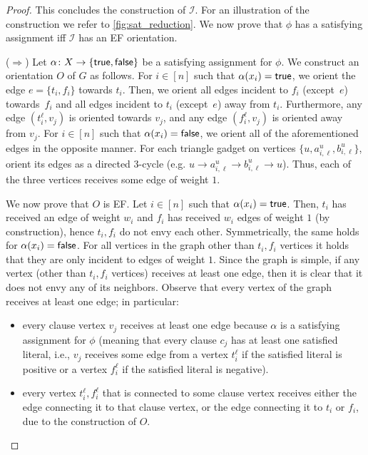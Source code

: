 \begin{proof}
    This concludes the construction of $\mathcal{I}$.
    For an illustration of the construction we refer to \cref{fig:sat_reduction}. We now prove that $\phi$ has a satisfying assignment iff $\mathcal{I}$ has an EF orientation.


    ($\Rightarrow$) Let $\alpha \colon X \to \{\mathsf{true}, \mathsf{false}\}$ be a satisfying assignment for $\phi$. We construct an orientation $O$ of $G$ as follows.
    For $i \in [n]$ such that $\alpha(x_i)=\mathsf{true}$, we orient the edge
    $e=\{t_i,f_i\}$ towards $t_i$. Then, we orient all edges incident to $f_i$ (except~$e$) towards~$f_i$ and all edges incident to $t_i$ (except~$e$) away from $t_i$.
    Furthermore, any edge $(t_i^\ell,v_j)$ is oriented towards $v_j$, and any edge $(f_i^\ell,v_j)$ is oriented away from $v_j$.
    For $i \in [n]$ such that $\alpha(x_i)=\mathsf{false}$, we orient all of the aforementioned edges in the opposite manner.
    For each triangle gadget on vertices  $\{u,a_{i,\ell}^u,b_{i,\ell}^u\}$, orient its edges as a directed $3$-cycle (e.g. $u \to a_{i,\ell}^u \to b_{i,\ell}^u \to u$). Thus, each of the three vertices receives some edge of weight $1$.

    We now prove that $O$ is EF. Let $i \in [n]$ such that $\alpha(x_i)=\mathsf{true}$. Then, $t_i$ has received an edge of weight $w_i$ and $f_i$ has received $w_i$ edges of weight $1$ (by construction), hence $t_i, f_i$ do not envy each other. Symmetrically, the same holds for $\alpha(x_i)=\mathsf{false}$.
    For all vertices in the graph other than $t_i, f_i$ vertices it holds that they are only incident to edges of weight $1$. Since the graph is simple, if any vertex (other than $t_i, f_i$ vertices) receives at least one edge, then it is clear that it does not envy any of its neighbors. Observe that every vertex of the graph receives at least one edge; in particular:

    \begin{itemize}
        \item every clause vertex $v_j$ receives at least one edge because $\alpha$ is a satisfying assignment for $\phi$ (meaning that every clause $c_j$ has at least one satisfied literal, i.e., $v_j$ receives some edge from a vertex $t_i^\ell$ if the satisfied literal is positive or a vertex $f_i^\ell$ if the satisfied literal is negative).

        \item every vertex $t_i^\ell, f_i^\ell$ that is connected to some clause vertex receives either the edge connecting it to that clause vertex, or the edge connecting it to $t_i$ or $f_i$, due to the construction of $O$.


\end{itemize}
\end{proof}
